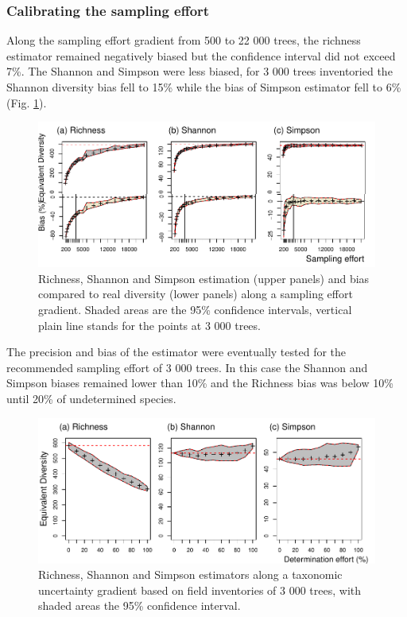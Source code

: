 \documentclass[
  11pt,
  french,
  A4paper,
  extrafontsizes,onecolumn,openright
  ]{memoir}
\begin{document}
\subsubsection{Calibrating the sampling
effort}\label{calibrating-the-sampling-effort}

Along the sampling effort gradient from 500 to 22 000 trees, the
richness estimator remained negatively biased but the confidence
interval did not exceed 7\%. The Shannon and Simpson were less biased,
for 3 000 trees inventoried the Shannon diversity bias fell to 15\%
while the bias of Simpson estimator fell to 6\% (Fig.
\ref{fig:SEgradient}).

\begin{figure}

{\centering \includegraphics[width=1\linewidth]{Manuscript_files/figure-latex/SEgradient-1} 

}

\caption{Richness, Shannon and Simpson estimation (upper panels) and bias compared to real diversity (lower panels) along a sampling effort gradient. Shaded areas are the 95\% confidence intervals, vertical plain line stands for the points at 3 000 trees.}\label{fig:SEgradient}
\end{figure}

The precision and bias of the estimator were eventually tested for the
recommended sampling effort of 3 000 trees. In this case the Shannon and
Simpson biases remained lower than 10\% and the Richness bias was below
10\% until 20\% of undetermined species.

\begin{figure}

{\centering \includegraphics[width=1\linewidth]{Manuscript_files/figure-latex/UncertGradLim-1} 

}

\caption{Richness, Shannon and Simpson estimators along a taxonomic uncertainty gradient based on field inventories of 3 000 trees,  with shaded areas the 95\% confidence interval.}\label{fig:UncertGradLim}
\end{figure}
\end{document}
